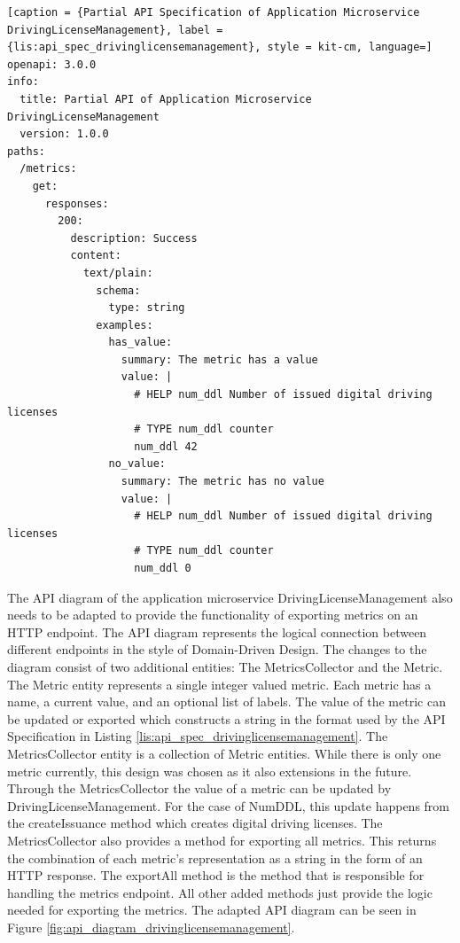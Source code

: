 \begin{lstlisting}[caption = {Partial API Specification of Application Microservice DrivingLicenseManagement}, label = {lis:api_spec_drivinglicensemanagement}, style = kit-cm, language=]
openapi: 3.0.0
info:
  title: Partial API of Application Microservice DrivingLicenseManagement
  version: 1.0.0
paths:
  /metrics:
    get:
      responses:
        200:
          description: Success
          content:
            text/plain:
              schema:
                type: string
              examples:
                has_value: 
                  summary: The metric has a value
                  value: |
                    # HELP num_ddl Number of issued digital driving licenses
                    # TYPE num_ddl counter
                    num_ddl 42
                no_value: 
                  summary: The metric has no value
                  value: |
                    # HELP num_ddl Number of issued digital driving licenses
                    # TYPE num_ddl counter
                    num_ddl 0
\end{lstlisting}

The API diagram of the application microservice DrivingLicenseManagement also needs to be adapted
to provide the functionality of exporting metrics on an HTTP endpoint. The API diagram
represents the logical connection between different endpoints in the style of Domain-Driven Design.
The changes to the diagram consist of two additional entities: The MetricsCollector and the Metric.
The Metric entity represents a single integer valued metric. Each metric has a name, a current value,
and an optional list of labels. The value of the metric can be updated or exported which constructs
a string in the format used by the API Specification in Listing \ref{lis:api_spec_drivinglicensemanagement}.
The MetricsCollector entity is a collection of Metric entities. While there is only one metric currently,
this design was chosen as it also extensions in the future. Through the MetricsCollector the value of
a metric can be updated by DrivingLicenseManagement. For the case of NumDDL, this update happens from
the createIssuance method which creates digital driving licenses.
The MetricsCollector also provides a method for exporting all metrics. This returns the combination
of each metric's representation as a string in the form of an HTTP response.
The exportAll method is the method that is responsible for handling the metrics endpoint. All other
added methods just provide the logic needed for exporting the metrics.
The adapted API diagram can be seen in Figure \ref{fig:api_diagram_drivinglicensemanagement}.

